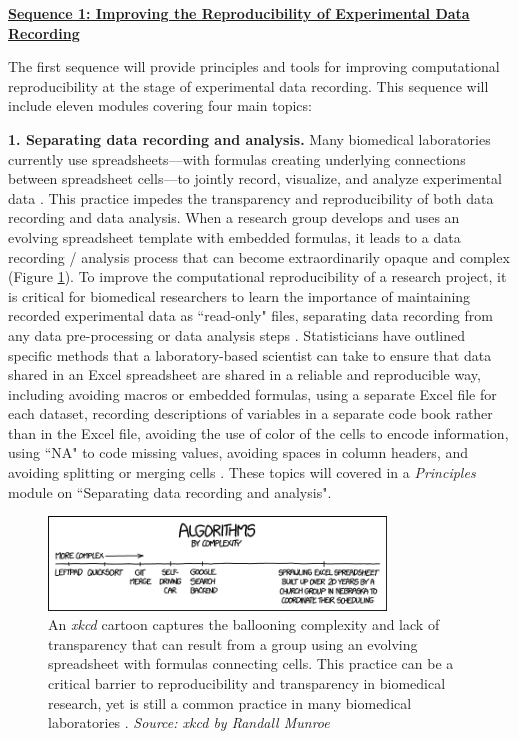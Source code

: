 \documentclass[pdftex,english,11pt,parskip=half]{scrartcl}
\begin{document}
\underline{\textbf{Sequence 1: Improving the Reproducibility of Experimental Data
Recording}} 

The first sequence will provide principles and tools for improving
computational reproducibility at the stage of experimental data recording. This sequence will include eleven modules covering four main topics: 

\textbf{1. Separating data recording and analysis.} Many biomedical laboratories currently use spreadsheets---with formulas creating underlying connections between spreadsheet cells---to jointly record, visualize, and analyze experimental data \cite{broman2018data}. This practice impedes the transparency and reproducibility of both data recording and data analysis. When a research group develops and uses an evolving spreadsheet template with embedded formulas, it leads to a data recording / analysis process that can become extraordinarily opaque and complex (Figure \ref{fig:spreadsheet}). To improve the computational reproducibility of a research project, it is critical for biomedical researchers to learn the importance of maintaining recorded experimental data as ``read-only" files, separating data recording from any data pre-processing or data analysis steps \cite{broman2018data, marwick2018packaging}. Statisticians have outlined specific methods that a laboratory-based scientist can take to ensure that data shared in an Excel spreadsheet are shared in a reliable and reproducible way, including avoiding macros or embedded formulas, using a separate Excel file for each dataset, recording descriptions of variables in a separate code book rather than in the Excel file, avoiding the use of color of the cells to encode information, using ``NA" to code missing values, avoiding spaces in column headers, and avoiding splitting or merging cells \cite{ellis2018share, broman2018data}. These topics will covered in a \textit{Principles} module on ``Separating data
recording and analysis". 

\begin{figure}[t] \centering \includegraphics[width =
0.8\textwidth]{figures/algorithms.png} \caption{An \textit{xkcd} cartoon
captures the ballooning complexity and lack of transparency that can result from
a group using an evolving spreadsheet with formulas connecting cells. This practice can be a
critical barrier to reproducibility and transparency in biomedical research, yet
is still a common practice in many biomedical laboratories \cite{broman2018data, marwick2018packaging}. \textit{Source: xkcd
by Randall Munroe}} \label{fig:spreadsheet} \end{figure}
\end{document}
